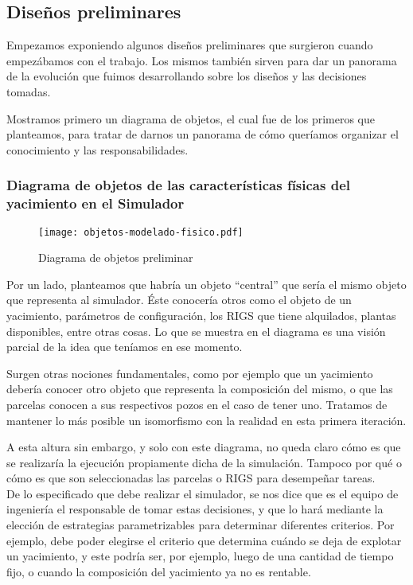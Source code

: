 \subsection{Diseños preliminares}

Empezamos exponiendo algunos diseños preliminares que surgieron cuando empezábamos 
con el trabajo. Los mismos también sirven para dar un panorama de la evolución 
que fuimos desarrollando sobre los diseños y las decisiones tomadas. 

Mostramos primero un diagrama de objetos, el cual fue de los primeros que 
planteamos, para tratar de darnos un panorama de cómo queríamos organizar 
el conocimiento y las responsabilidades. 

\subsubsection{Diagrama de objetos de las características físicas del yacimiento en el Simulador}

\begin{figure}[H]
\caption{Diagrama de objetos preliminar}
\texttt{[image: objetos-modelado-fisico.pdf]}
\end{figure}

Por un lado, planteamos que habría un objeto ``central'' que sería el mismo 
objeto que representa al simulador. Éste conocería otros como el objeto de un 
yacimiento, parámetros de configuración, los RIGS que tiene alquilados, plantas 
disponibles, entre otras cosas. Lo que se muestra en el diagrama es una visión 
parcial de la idea que teníamos en ese momento. 

Surgen otras nociones fundamentales, como por ejemplo que un yacimiento debería 
conocer otro objeto que representa la composición del mismo, o que las parcelas 
conocen a sus respectivos pozos en el caso de tener uno. Tratamos de mantener 
lo más posible un isomorfismo con la realidad en esta primera iteración. 

A esta altura sin embargo, y solo con este diagrama, no queda claro cómo es que 
se realizaría la ejecución propiamente dicha de la simulación. Tampoco por qué 
o cómo es que son seleccionadas las parcelas o RIGS para desempeñar tareas. \\

De lo especificado que debe realizar el simulador, se nos dice que es el equipo 
de ingeniería el responsable de tomar estas decisiones, y que lo hará mediante 
la elección de estrategias parametrizables para determinar diferentes criterios. 
Por ejemplo, debe poder elegirse el criterio que determina cuándo se deja de 
explotar un yacimiento, y este podría ser, por ejemplo, luego de una cantidad de 
tiempo fijo, o cuando la composición del yacimiento ya no es rentable. 

